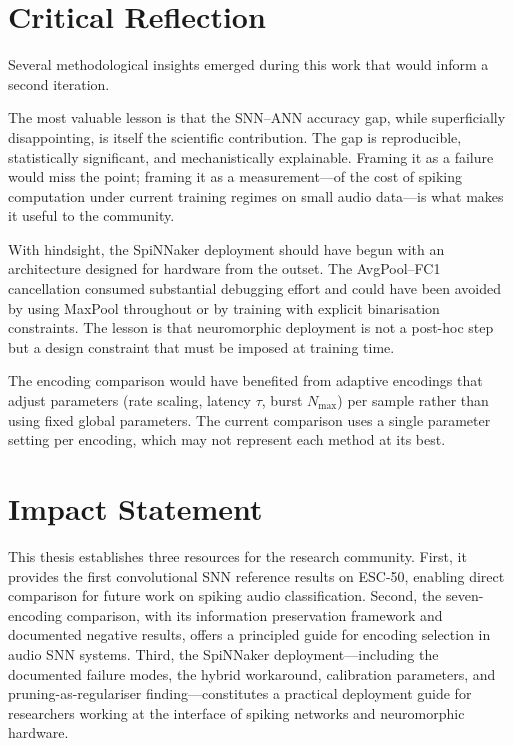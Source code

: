 \section{Critical Reflection}
\label{sec:reflection}

Several methodological insights emerged during this work that would inform a second iteration.

The most valuable lesson is that the SNN--ANN accuracy gap, while superficially disappointing, is itself the scientific contribution. The gap is reproducible, statistically significant, and mechanistically explainable. Framing it as a failure would miss the point; framing it as a measurement---of the cost of spiking computation under current training regimes on small audio data---is what makes it useful to the community.

With hindsight, the SpiNNaker deployment should have begun with an architecture designed for hardware from the outset. The AvgPool--FC1 cancellation consumed substantial debugging effort and could have been avoided by using MaxPool throughout or by training with explicit binarisation constraints. The lesson is that neuromorphic deployment is not a post-hoc step but a design constraint that must be imposed at training time.

The encoding comparison would have benefited from adaptive encodings that adjust parameters (rate scaling, latency $\tau$, burst $N_\text{max}$) per sample rather than using fixed global parameters. The current comparison uses a single parameter setting per encoding, which may not represent each method at its best.

\section{Impact Statement}
\label{sec:impact}

This thesis establishes three resources for the research community. First, it provides the first convolutional SNN reference results on ESC-50, enabling direct comparison for future work on spiking audio classification. Second, the seven-encoding comparison, with its information preservation framework and documented negative results, offers a principled guide for encoding selection in audio SNN systems. Third, the SpiNNaker deployment---including the documented failure modes, the hybrid workaround, calibration parameters, and pruning-as-regulariser finding---constitutes a practical deployment guide for researchers working at the interface of spiking networks and neuromorphic hardware.

